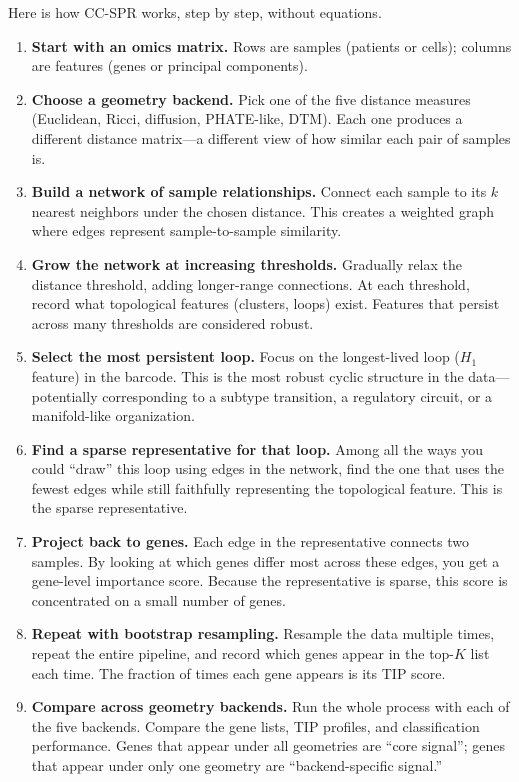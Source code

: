 \documentclass[11pt]{article}
\begin{document}
Here is how CC-SPR works, step by step, without equations.

\begin{enumerate}[leftmargin=1.5em]
\item \textbf{Start with an omics matrix.}
Rows are samples (patients or cells); columns are features (genes or principal components).

\item \textbf{Choose a geometry backend.}
Pick one of the five distance measures (Euclidean, Ricci, diffusion, PHATE-like, DTM).
Each one produces a different distance matrix---a different view of how similar each pair of samples is.

\item \textbf{Build a network of sample relationships.}
Connect each sample to its $k$ nearest neighbors under the chosen distance.
This creates a weighted graph where edges represent sample-to-sample similarity.

\item \textbf{Grow the network at increasing thresholds.}
Gradually relax the distance threshold, adding longer-range connections.
At each threshold, record what topological features (clusters, loops) exist.
Features that persist across many thresholds are considered robust.

\item \textbf{Select the most persistent loop.}
Focus on the longest-lived loop ($H_1$ feature) in the barcode.
This is the most robust cyclic structure in the data---potentially corresponding to a subtype transition, a regulatory circuit, or a manifold-like organization.

\item \textbf{Find a sparse representative for that loop.}
Among all the ways you could ``draw'' this loop using edges in the network, find the one that uses the fewest edges while still faithfully representing the topological feature.
This is the sparse representative.

\item \textbf{Project back to genes.}
Each edge in the representative connects two samples.
By looking at which genes differ most across these edges, you get a gene-level importance score.
Because the representative is sparse, this score is concentrated on a small number of genes.

\item \textbf{Repeat with bootstrap resampling.}
Resample the data multiple times, repeat the entire pipeline, and record which genes appear in the top-$K$ list each time.
The fraction of times each gene appears is its TIP score.

\item \textbf{Compare across geometry backends.}
Run the whole process with each of the five backends.
Compare the gene lists, TIP profiles, and classification performance.
Genes that appear under all geometries are ``core signal''; genes that appear under only one geometry are ``backend-specific signal.''
\end{enumerate}
\end{document}
